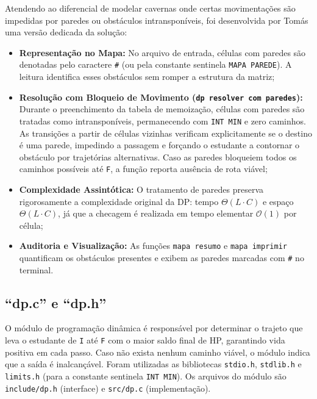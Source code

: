 \documentclass[12pt,a4paper]{article}
\makeatletter
\DeclareRobustCommand{\_}{%
  \ifmmode
    \nfss@text{\textunderscore}%
  \else
    \textunderscore\allowbreak
  \fi
}
\makeatother
\begin{document}
Atendendo ao diferencial de modelar cavernas onde certas movimentações são impedidas por paredes ou obstáculos intransponíveis, foi desenvolvida por Tomás uma versão dedicada da solução:
\begin{itemize}
    \item \textbf{Representação no Mapa:} No arquivo de entrada, células com paredes são denotadas pelo caractere \texttt{\#} (ou pela constante sentinela \texttt{MAPA\_PAREDE}). A leitura identifica esses obstáculos sem romper a estrutura da matriz;
    \item \textbf{Resolução com Bloqueio de Movimento (\texttt{dp\_resolver\_com\_paredes}):} Durante o preenchimento da tabela de memoização, células com paredes são tratadas como intransponíveis, permanecendo com \texttt{INT\_MIN} e zero caminhos. As transições a partir de células vizinhas verificam explicitamente se o destino é uma parede, impedindo a passagem e forçando o estudante a contornar o obstáculo por trajetórias alternativas. Caso as paredes bloqueiem todos os caminhos possíveis até \texttt{F}, a função reporta ausência de rota viável;
    \item \textbf{Complexidade Assintótica:} O tratamento de paredes preserva rigorosamente a complexidade original da DP: tempo $\Theta(L \cdot C)$ e espaço $\Theta(L \cdot C)$, já que a checagem é realizada em tempo elementar $\mathcal{O}(1)$ por célula;
    \item \textbf{Auditoria e Visualização:} As funções \texttt{mapa\_resumo} e \texttt{mapa\_imprimir} quantificam os obstáculos presentes e exibem as paredes marcadas com \texttt{\#} no terminal.
\end{itemize}


\subsection{``dp.c'' e ``dp.h''}

O módulo de programação dinâmica é responsável por determinar o trajeto que leva o estudante de \texttt{I} até \texttt{F} com o maior saldo final de HP, garantindo vida positiva em cada passo. Caso não exista nenhum caminho viável, o módulo indica que a saída é inalcançável. Foram utilizadas as bibliotecas \texttt{stdio.h}, \texttt{stdlib.h} e \texttt{limits.h} (para a constante sentinela \texttt{INT\_MIN}). Os arquivos do módulo são \texttt{include/dp.h} (interface) e \texttt{src/dp.c} (implementação).
\end{document}
